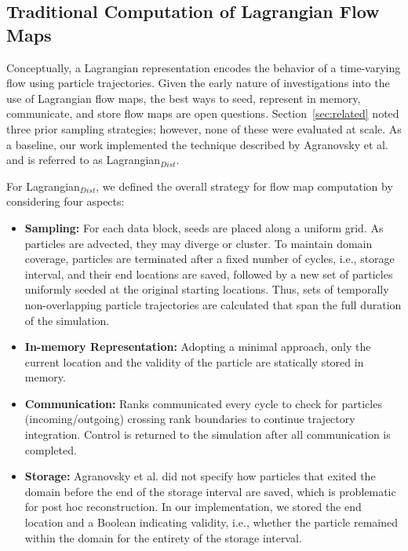

\subsection{Traditional Computation of Lagrangian Flow Maps}
\label{sec:baseline}
Conceptually, a Lagrangian representation encodes the behavior of a time-varying flow using particle trajectories.
%
Given the early nature of investigations into the use of Lagrangian flow maps, the best ways to seed, represent in memory, communicate, and store flow maps are open questions. 
%
%
Section~\ref{sec:related} noted three prior sampling strategies; however, none of these were evaluated at scale.
%
As a baseline, our work implemented the technique described by Agranovsky et al.~\cite{agranovsky2014improved}
%
and is referred to as Lagrangian$_{Dist}$.

For Lagrangian$_{Dist}$, we defined the overall strategy for flow map computation by considering four aspects:
%
\begin{itemize}[leftmargin=*]
\item\textbf{Sampling:} For each data block, seeds are placed along a uniform grid. As particles are advected, they may diverge or cluster. 
%
To maintain domain coverage, particles are terminated after a fixed number of cycles, i.e., storage interval, and their end locations are saved, followed by a new set of particles uniformly seeded at the original starting locations.
%
Thus, sets of temporally non-overlapping particle trajectories are calculated that span the full duration of the simulation.
%
\item\textbf{In-memory Representation:} %
%
Adopting a minimal approach, only the current location and the validity of the particle are statically stored in memory. 
%
\item\textbf{Communication:} Ranks communicated every cycle to check for particles (incoming/outgoing) crossing rank boundaries to continue trajectory integration. 
%
Control is returned to the simulation after all communication is completed.
\item\textbf{Storage:} Agranovsky et al. did not specify how particles that exited the domain before the end of the storage interval are saved,
%
which is problematic for post hoc reconstruction. 
%
In our implementation, we stored the end location and a Boolean indicating validity, i.e., whether the particle remained within the domain for the entirety of the storage interval. 
%
%
\end{itemize}

